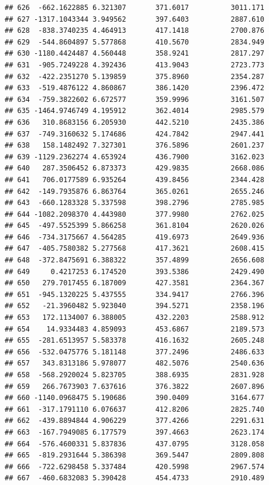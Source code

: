 \documentclass[
]{article}
\begin{document}
\begin{verbatim}
## 626  -662.1622885 6.321307       371.6017          3011.171
## 627 -1317.1043344 3.949562       397.6403          2887.610
## 628  -838.3740235 4.464913       417.1418          2700.876
## 629  -544.8604897 5.577868       410.5670          2834.949
## 630 -1180.4424487 4.560448       358.9241          2817.297
## 631  -905.7249228 4.392436       413.9043          2723.773
## 632  -422.2351270 5.139859       375.8960          2354.287
## 633  -519.4876122 4.860867       386.1420          2396.472
## 634  -759.3822602 6.672577       359.9996          3161.507
## 635 -1464.9746749 4.195912       362.4014          2985.579
## 636   310.8683156 6.205930       442.5210          2435.386
## 637  -749.3160632 5.174686       424.7842          2947.441
## 638   158.1482492 7.327301       376.5896          2601.237
## 639 -1129.2362274 4.653924       436.7900          3162.023
## 640   287.3506452 6.873373       429.9835          2668.086
## 641   706.0177589 6.935264       439.8456          2344.428
## 642  -149.7935876 6.863764       365.0261          2655.246
## 643  -660.1283328 5.337598       398.2796          2785.985
## 644 -1082.2098370 4.443980       377.9980          2762.025
## 645  -497.5525399 5.866258       361.8104          2620.026
## 646  -734.3175667 4.564285       419.6973          2649.936
## 647  -405.7580382 5.277568       417.3621          2608.415
## 648  -372.8475691 6.388322       357.4899          2656.608
## 649     0.4217253 6.174520       393.5386          2429.490
## 650   279.7017455 6.187009       427.3581          2364.367
## 651  -945.1320225 5.437555       334.9417          2766.396
## 652   -21.3960482 5.923040       394.5271          2358.196
## 653   172.1134007 6.388005       432.2203          2588.912
## 654    14.9334483 4.859093       453.6867          2189.573
## 655  -281.6513957 5.583378       416.1632          2605.248
## 656  -532.0475776 5.181148       377.2496          2486.633
## 657   343.8313186 5.978077       482.5076          2540.636
## 658  -568.2920024 5.823705       388.6935          2831.928
## 659   266.7673903 7.637616       376.3822          2607.896
## 660 -1140.0968475 5.190686       390.0409          3164.677
## 661  -317.1791110 6.076637       412.8206          2825.740
## 662  -439.8894844 4.906229       377.4266          2291.631
## 663  -167.7949085 6.177579       397.4663          2623.174
## 664  -576.4600331 5.837836       437.0795          3128.058
## 665  -819.2931644 5.386398       369.5447          2809.808
## 666  -722.6298458 5.337484       420.5998          2967.574
## 667  -460.6832083 5.390428       454.4733          2910.489

\end{verbatim}
\end{document}
